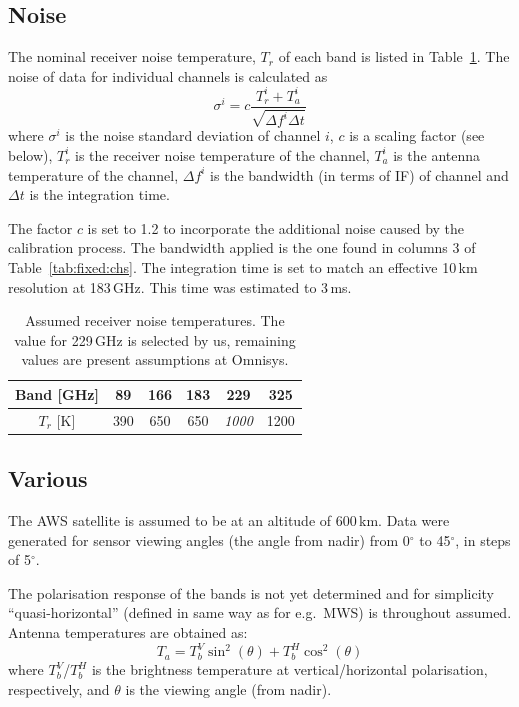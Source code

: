 \documentclass[12pt]{article}
\begin{document}
\subsection{Noise}
%
The nominal receiver noise temperature, $T_r$ of each band is listed in
Table~\ref{tab:trec}. The noise of data for individual channels is calculated
as
\begin{equation}
  \sigma^i = c \frac{T^i_r+T^i_a}{\sqrt{\Delta\!f^i\Delta t}}
  \label{eq:noise}
\end{equation}
where $\sigma^i$ is the noise standard deviation of channel $i$, $c$ is a
scaling factor (see below), $T^i_r$ is the receiver noise temperature of the
channel, $T^i_a$ is the antenna temperature of the channel, $\Delta\!f^i$ is
the bandwidth (in terms of IF) of channel and $\Delta t$ is the integration
time.

The factor $c$ is set to 1.2 to incorporate the additional noise caused by the
calibration process. The bandwidth applied is the one found in columns 3 of
Table~\ref{tab:fixed:chs}. The integration time is set to match an effective
10\,km resolution at 183\,GHz. This time was estimated to 3\,ms. 

\begin{table}[!bt]
  \centering
  \begin{tabular}[b]{c|ccccc}
    Band [GHz]   & 89 & 166 & 183 & 229 & 325 \\
    \hline
    $T_r$ [K]    & 390 & 650 & 650 & {\it 1000}  & 1200 \\
    \hline
  \end{tabular}
  \caption{Assumed receiver noise temperatures. The value for 229\,GHz is
    selected by us, remaining values are present assumptions at Omnisys.}
  \label{tab:trec}
\end{table}

\subsection{Various}
%
The AWS satellite is assumed to be at an altitude of 600\,km. Data were
generated for sensor viewing angles (the angle from nadir) from 0$^\circ$ to
45$^\circ$, in steps of 5$^\circ$.

The polarisation response of the bands is not yet determined and for simplicity
``quasi-horizontal'' (defined in same way as for e.g.\ MWS) is throughout
assumed. Antenna temperatures are obtained as:
\begin{equation}
  \label{eq:polrot}
  T_a = T_b^V\sin^2(\theta) + T_b^H\cos^2(\theta)
\end{equation}
where $T_b^V$/$T_b^H$ is the brightness temperature at vertical/horizontal
polarisation, respectively, and $\theta$ is the viewing angle (from nadir).
\end{document}

